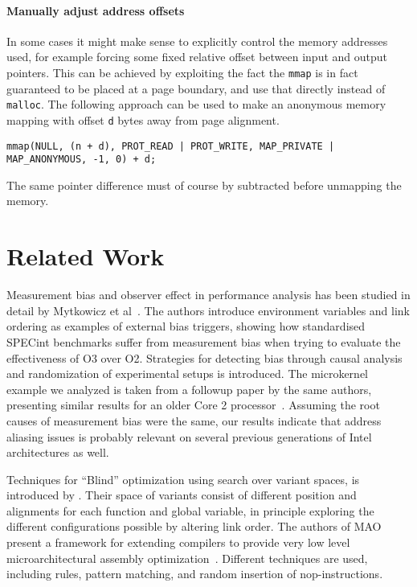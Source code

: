 \documentclass[prodmode,acmtaco]{acmsmall}
\begin{document}
{\paragraph{Manually adjust address offsets}
In some cases it might make sense to explicitly control the memory addresses used, for example forcing some fixed relative offset between input and output pointers.
This can be achieved by exploiting the fact the \texttt{mmap} is in fact guaranteed to be placed at a page boundary, and use that directly instead of \texttt{malloc}.
The following approach can be used to make an anonymous memory mapping with offset \texttt{d} bytes away from page alignment.
\begin{lstlisting}[breaklines=true]
    mmap(NULL, (n + d), PROT_READ | PROT_WRITE, MAP_PRIVATE | MAP_ANONYMOUS, -1, 0) + d;
\end{lstlisting}
The same pointer difference must of course by subtracted before unmapping the memory.


\section{Related Work}
\label{sec:related}
Measurement bias and observer effect in performance analysis has been studied in detail by Mytkowicz et al~.
The authors introduce environment variables and link ordering as examples of external bias triggers, showing how standardised {\small SPECint} benchmarks suffer from measurement bias when trying to evaluate the effectiveness of O3 over O2. 
Strategies for detecting bias through causal analysis and randomization of experimental setups is introduced.
The microkernel example we analyzed is taken from a followup paper by the same authors, presenting similar results for an older Core 2 processor~\cite{Mytkowicz:2009:WrongData}.
Assuming the root causes of measurement bias were the same, our results indicate that address aliasing issues is probably relevant on several previous generations of Intel architectures as well.

Techniques for ``Blind'' optimization using search over variant spaces, is introduced by .
Their space of variants consist of different position and alignments for each function and global variable, in principle exploring the different configurations possible by altering link order.
The authors of MAO present a framework for extending compilers to provide very low level microarchitectural assembly optimization~\cite{Hundt:2011:MAO}.
Different techniques are used, including rules, pattern matching, and random insertion of nop-instructions. 


}
\end{document}
